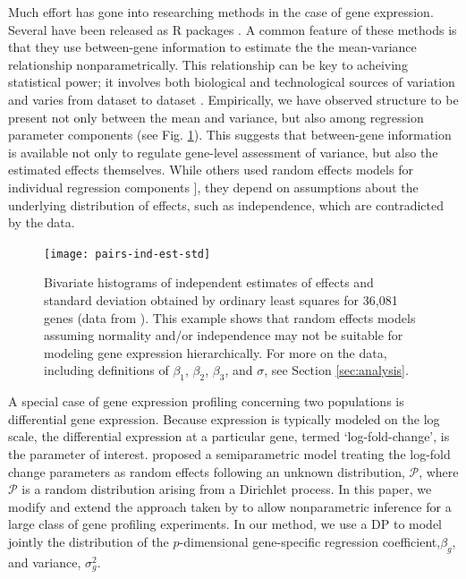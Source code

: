 Much effort has gone into researching methods in the case of gene expression. Several have been released as R packages \citep{edger2010,deseq2014,voom}. A common feature of these methods is that they use between-gene information to estimate the the  mean-variance relationship nonparametrically. This relationship can be key to acheiving statistical power; it involves both biological and technological sources of variation and varies from dataset to dataset \citep{voom}. Empirically, we have observed structure to be present not only between the mean and variance, but also among regression parameter components (see Fig. \ref{pairs-ind-est}). This suggests that between-gene information is available not only to regulate gene-level assessment of variance, but also the estimated effects themselves. While others used random effects models for individual regression components \citep{deseq2014,landau}], they depend on assumptions about the underlying distribution of effects, such as independence, which are contradicted by the data.

\begin{figure}[ht]
\centering
\texttt{[image: pairs-ind-est-std]}
\caption{\small Bivariate histograms of independent estimates of effects and standard deviation obtained by ordinary least squares for 36,081 genes (data from \cite{paschold}). This example shows that random effects models assuming normality and/or independence may not be suitable for modeling gene expression hierarchically. For more on the data, including definitions of $\beta_1$, $\beta_2$, $\beta_3$, and $\sigma$, see Section \ref{sec:analysis}.}
\label{pairs-ind-est}
\end{figure}

A special case of gene expression profiling concerning two populations is differential gene expression. Because expression is typically modeled on the log scale, the differential expression at a particular gene, termed `log-fold-change', is the parameter of interest. \citet{liu} proposed a semiparametric model treating the log-fold change parameters as random effects following an unknown distribution, $\mathcal{P}$, where $\mathcal{P}$ is a random distribution arising from a Dirichlet process. In this paper, we modify and extend the approach taken by \cite{liu} to allow nonparametric inference for a large class of gene profiling experiments. In our method, we use a DP to model jointly the distribution of the $p$-dimensional gene-specific regression coefficient,$\beta_g$, and variance, $\sigma^2_g$.

